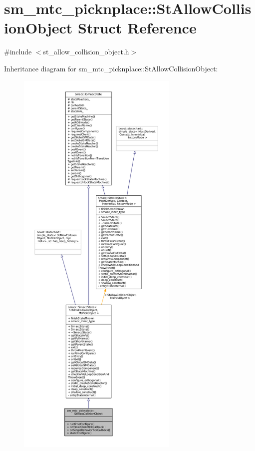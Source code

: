 \hypertarget{structsm__mtc__picknplace_1_1StAllowCollisionObject}{}\section{sm\+\_\+mtc\+\_\+picknplace\+:\+:St\+Allow\+Collision\+Object Struct Reference}
\label{structsm__mtc__picknplace_1_1StAllowCollisionObject}


{\ttfamily \#include $<$st\+\_\+allow\+\_\+collision\+\_\+object.\+h$>$}



Inheritance diagram for sm\+\_\+mtc\+\_\+picknplace\+:\+:St\+Allow\+Collision\+Object\+:
\nopagebreak
\begin{figure}[H]
\begin{center}
\leavevmode
\includegraphics[height=550pt]{structsm__mtc__picknplace_1_1StAllowCollisionObject__inherit__graph}
\end{center}
\end{figure}


